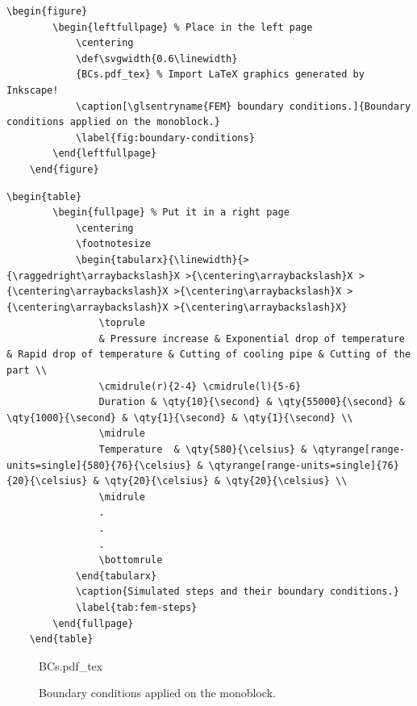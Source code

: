 \begin{lstlisting}[language={[LaTeX]TeX}]
	\begin{figure}
		\begin{leftfullpage} % Place in the left page
			\centering
			\def\svgwidth{0.6\linewidth}
			{BCs.pdf_tex} % Import LaTeX graphics generated by Inkscape!
			\caption[\glsentryname{FEM} boundary conditions.]{Boundary conditions applied on the monoblock.}
			\label{fig:boundary-conditions}
		\end{leftfullpage}
	\end{figure}
\end{lstlisting}

\begin{lstlisting}[language={[LaTeX]TeX}]
	\begin{table}
		\begin{fullpage} % Put it in a right page
			\centering
			\footnotesize
			\begin{tabularx}{\linewidth}{>{\raggedright\arraybackslash}X >{\centering\arraybackslash}X >{\centering\arraybackslash}X >{\centering\arraybackslash}X >{\centering\arraybackslash}X >{\centering\arraybackslash}X}
				\toprule
				& Pressure increase & Exponential drop of temperature & Rapid drop of temperature & Cutting of cooling pipe & Cutting of the part \\
				\cmidrule(r){2-4} \cmidrule(l){5-6}
				Duration & \qty{10}{\second} & \qty{55000}{\second} & \qty{1000}{\second} & \qty{1}{\second} & \qty{1}{\second} \\
				\midrule
				Temperature  & \qty{580}{\celsius} & \qtyrange[range-units=single]{580}{76}{\celsius} & \qtyrange[range-units=single]{76}{20}{\celsius} & \qty{20}{\celsius} & \qty{20}{\celsius} \\
				\midrule
				.
				.
				.
				\bottomrule
			\end{tabularx}
			\caption{Simulated steps and their boundary conditions.}
			\label{tab:fem-steps}
		\end{fullpage}
	\end{table}
\end{lstlisting}

\begin{figure}
	\begin{leftfullpage} %
		\centering
		\def\svgwidth{0.6\linewidth}
		{BCs.pdf_tex} %
		\caption[ boundary conditions.]{Boundary conditions applied on the monoblock.}
		\label{fig:boundary-conditions}
	\end{leftfullpage}
\end{figure}

